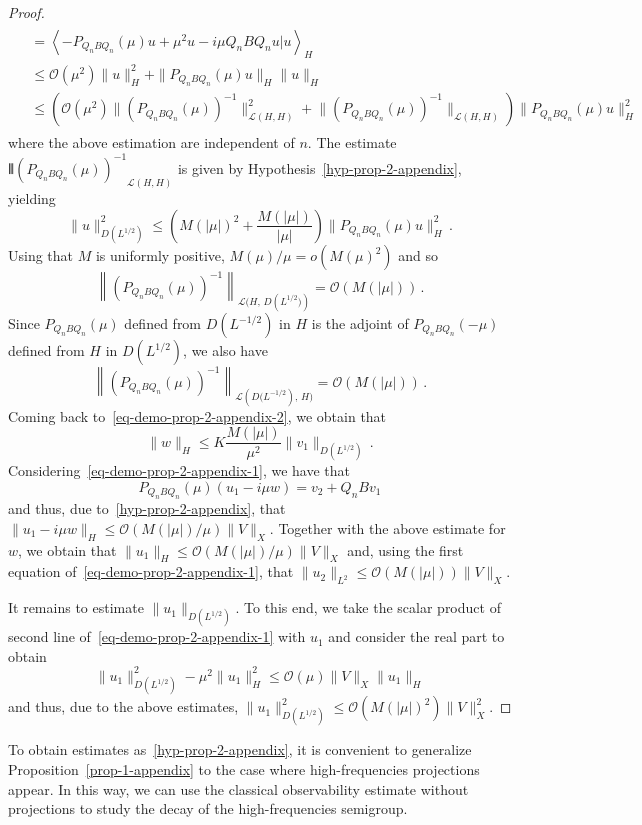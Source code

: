 \documentclass[AHL,Unicode,longabstracts]{cedram}
\newcommand{\Lc}{\mathcal{L}}
\newcommand{\Oc}{\mathcal{O}}
\DeclarePairedDelimiter{\VERT}{|\mkern -1.6mu|\mkern -1.6mu|}{|\mkern -1.6mu|\mkern -1.6mu|}
\begin{document}
\begin{proof}
\begin{multline*}
\begin{aligned}
&= \left\langle -P_{Q_n B Q_n}(\mu)u + \mu^2 u -i\mu Q_n B Q_n u|u\right\rangle_{H}\\
&\leq \Oc(\mu^2)\|u\|_{H}^2 + \|P_{Q_n B Q_n}(\mu)u\|_{H}\|u\|_H\\
&\leq\!\!\left(\Oc(\mu^2)\|(P_{Q_n B Q_n}(\mu))^{-1}\|^2_{\Lc(H,H)}\!+\!\|(P_{Q_n B Q_n}(\mu))^{-1}\|_{\Lc(H,H)}\right)
\|P_{Q_n B Q_n}(\mu)u\|_{H}^2
\end{aligned}
\end{multline*}
where the above estimation are independent of $n$. The estimate $\VERT{\!(P_{Q_n B Q_n}\!(\mu)\!)^{-1}}_{\!\Lc(H,H)}$ is given by Hypothesis~\eqref{hyp-prop-2-appendix}, yielding
\[
\|u\|_{D\left(L^{1/2}\right)}^2 \leq \left(M(|\mu|)^2 + \frac{M(|\mu|)}{|\mu|}\right)
\|P_{Q_n B Q_n}(\mu)u\|_{H}^2\,.
\]
Using that $M$ is uniformly positive, $M(\mu)/\mu=o(M(\mu)^2)$ and so
\[
\left\|(P_{Q_n B Q_n}(\mu))^{-1}\right\|_{\Lc(H,\,D\left(L^{1/2})\right)} = \Oc(M(|\mu|))\,.
\]
Since $P_{Q_n B Q_n}(\mu)$ defined from $D(L^{-1/2})$ in $H$ is the adjoint of $P_{Q_n B Q_n}(-\mu)$ defined from $H$ in $D(L^{1/2})$, we also have
\[
\left\|(P_{Q_n B Q_n}(\mu))^{-1}\right\|_{\Lc\left(D(L^{-1/2}\right),\,H)}=\Oc(M(|\mu|))\,.
\]
Coming back to~\eqref{eq-demo-prop-2-appendix-2}, we obtain that
\[
\|w\|_{H}\leq K\frac{M(|\mu|)}{\mu^2}\|v_1\|_{D\left(L^{1/2}\right)}\,.
\]
Considering~\eqref{eq-demo-prop-2-appendix-1}, we have that
\[
P_{Q_n B Q_n}(\mu)(u_1-i\mu w)=v_2+Q_n B v_1
\]
and thus, due to~\eqref{hyp-prop-2-appendix}, that $\|u_1-i\mu w\|_{H}\leq \Oc(M(|\mu|)/\mu) \|V\|_X$. Together with the above estimate for $w$, we obtain that $\|u_1\|_{H}\leq \Oc(M(|\mu|)/\mu)
\|V\|_X$ and, using the first equation of~\eqref{eq-demo-prop-2-appendix-1}, that $\|u_2\|_{L^2}\leq \Oc(M(|\mu|))\|V\|_X$.

It remains to estimate $\|u_1\|_{D(L^{1/2})}$. To this end, we take the scalar product of second line of~\eqref{eq-demo-prop-2-appendix-1} with $u_1$ and consider the real part to obtain
\[
\|u_1\|_{D(L^{1/2})}^2-\mu^2 \|u_1\|_{H}^2\leq
\Oc(\mu)\|V\|_X\|u_1\|_{H}
\]
and thus, due to the above estimates, $\|u_1\|_{D(L^{1/2})}^2 \leq
\Oc(M(|\mu|)^2) \|V\|^2_X$.
\end{proof}

To obtain estimates as~\eqref{hyp-prop-2-appendix}, it is convenient to generalize Proposition~\ref{prop-1-appendix} to the case where high-frequencies projections appear. In this way, we can use the classical observability estimate without projections to study the decay of the high-frequencies semigroup.
\end{document}
